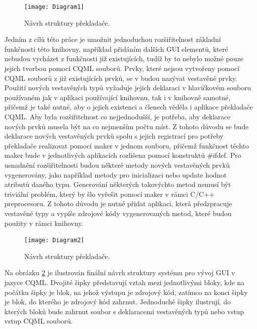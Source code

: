 \documentclass[report,11pt]{elsarticle}
\begin{document}
\begin{figure}[!ht]
\begin{center}
  \texttt{[image: Diagram1]}
\caption{{\label{fig:structure1}}Návrh struktury překladače.}
\end{center}
\end{figure}

Jedním z cílů této práce je umožnit jednoduchou rozšiřitelnost základní funkčnosti této knihovny, například přidáním dalších GUI elementů, které nebudou vycházet z funkčnosti již existujících, tudíž by to nebylo možné pouze jejich tvorbou pomocí CQML souborů. Prvky, které nejsou vytvořeny pomocí CQML souborů z již existujících prvků, se v budou nazývat vestavěné prvky.
Použití nových vestavěných typů vyžaduje jejich deklaraci v hlavičkovém souboru používaném jak v aplikaci používající knihovnu, tak i v knihovně samotné, přičemž je také nutné, aby o jejich existenci a členech věděla i aplikace překladače CQML. Aby byla rozšiřitelnost co nejjednodušší, je potřeba, aby deklarace nových prvků musela být na co nejmenším počtu míst. Z tohoto důvodu se bude deklarace nových vestavěných prvků spolu s jejich registrací pro potřeby překladače realizovat pomocí maker v jednom souboru, přičemž funkčnost těchto maker bude v jednotlivých aplikacích rozlišena pomocí konstruktů \#ifdef.
Pro usnadnění rozšiřitelnosti budou některé metody nových vestavěných prvků vygenerovány, jako například metody pro inicializaci nebo update hodnot atributů daného typu. Generování některých takovýchto metod nemusí být triviální problém, který by šlo vyřešit pomocí maker v rámci C/C++ preprocesoru. Z tohoto důvodu je nutné přidat aplikaci, která předzpracuje vestavěné typy a vypíše zdrojové kódy vygenerovaných metod, které budou použity v rámci knihovny.

\begin{figure}[!ht]
\begin{center}
  \texttt{[image: Diagram2]}
\caption{{\label{fig:structure2}}Návrh struktury překladače.}
\end{center}
\end{figure}

Na obrázku \ref{fig:structure2} je ilustrován finální návrh struktury systému pro vývoj GUI v jazyce CQML. Dvojité šipky představují vztah mezi jednotlivými bloky, kde na počátku šipky je blok, na jehož výstupu je zdrojový kód, zatímco na konci šipky je blok, do kterého je zdrojový kód zahrnut. Jednoduché šipky ilustrují, do kterých bloků bude zahrnut soubor s deklaracemi vestavěných typů nebo vstup vstup CQML souborů.
\end{document}
